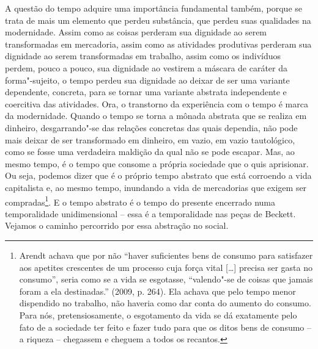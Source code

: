 {A questão do tempo adquire uma importância fundamental também, porque se
trata de mais um elemento que perdeu substância, que perdeu suas
qualidades na modernidade. Assim como as coisas perderam sua dignidade
ao serem transformadas em mercadoria, assim como as atividades
produtivas perderam sua dignidade ao serem transformadas em trabalho,
assim como os indivíduos perdem, pouco a pouco, sua dignidade ao
vestirem a máscara de caráter da forma"-sujeito, o tempo perdeu sua
dignidade ao deixar de ser uma variante dependente, concreta, para se
tornar uma variante abstrata independente e coercitiva das atividades.
Ora, o transtorno da experiência com o tempo é marca da modernidade.
Quando o tempo se torna a mônada abstrata que se realiza em dinheiro,
desgarrando"-se das relações concretas das quais dependia, não pode mais
deixar de ser transformado em dinheiro, em vazio, em vazio tautológico,
como se fosse uma verdadeira maldição da qual não se pode escapar. Mas,
ao mesmo tempo, é o tempo que consome a própria sociedade que o quis
aprisionar. Ou seja, podemos dizer que é o próprio tempo abstrato que
está corroendo a vida capitalista e, ao mesmo tempo, inundando a vida de
mercadorias que exigem ser compradas\footnote{Arendt achava que por não
  ``haver suficientes bens de consumo para satisfazer aos apetites
  crescentes de um processo cuja força vital [\ldots{}] precisa ser gasta
  no consumo'', seria como se a vida se esgotasse, ``valendo"-se de
  coisas que jamais foram a ela destinadas.'' (2009, p. 264). Ela achava
  que pelo tempo menor dispendido no trabalho, não haveria como dar
  conta do aumento do consumo. Para nós, pretensiosamente, o esgotamento
  da vida se dá exatamente pelo fato de a sociedade ter feito e fazer
  tudo para que os ditos bens de consumo -- a riqueza -- chegassem e
  cheguem a todos os recantos.}. E o tempo abstrato é o tempo do
presente encerrado numa temporalidade unidimensional -- essa é a
temporalidade nas peças de Beckett. Vejamos o caminho percorrido por
essa abstração no social.

}
